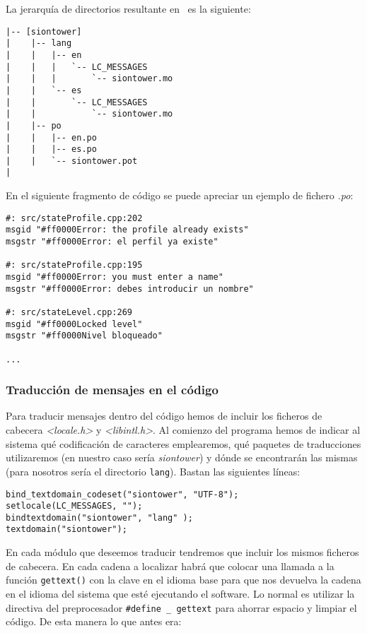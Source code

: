 La jerarquía de directorios resultante en \juego\ es la siguiente:\\

\begin{verbatim}
|-- [siontower]
|    |-- lang
|    |   |-- en
|    |   |   `-- LC_MESSAGES
|    |   |       `-- siontower.mo
|    |   `-- es
|    |       `-- LC_MESSAGES
|    |           `-- siontower.mo
|    |-- po
|    |   |-- en.po
|    |   |-- es.po
|    |   `-- siontower.pot
|
\end{verbatim}

En el siguiente fragmento de código se puede apreciar un ejemplo
de fichero \textit{.po}:\\

\begin{verbatim}
#: src/stateProfile.cpp:202
msgid "#ff0000Error: the profile already exists"
msgstr "#ff0000Error: el perfil ya existe"

#: src/stateProfile.cpp:195
msgid "#ff0000Error: you must enter a name"
msgstr "#ff0000Error: debes introducir un nombre"

#: src/stateLevel.cpp:269
msgid "#ff0000Locked level"
msgstr "#ff0000Nivel bloqueado"

...
\end{verbatim}

\subsubsection{Traducción de mensajes en el código}

Para traducir mensajes dentro del código hemos de incluir los ficheros de
cabecera \textit{<locale.h>} y \textit{<libintl.h>}. Al comienzo del programa
hemos de indicar al sistema qué codificación de caracteres emplearemos,
qué paquetes de traducciones utilizaremos (en nuestro
caso sería \textit{siontower}) y dónde se encontrarán las mismas (para nosotros
sería el directorio \texttt{lang}). Bastan las siguientes líneas:\\

\begin{lstlisting}[style=C++]
bind_textdomain_codeset("siontower", "UTF-8");
setlocale(LC_MESSAGES, "");
bindtextdomain("siontower", "lang" );
textdomain("siontower");
\end{lstlisting}

En cada módulo que deseemos traducir tendremos que incluir los mismos ficheros
de cabecera. En cada cadena a localizar habrá que colocar una llamada a la
función \texttt{gettext()} con la clave en el idioma base para que nos
devuelva la cadena en el idioma del sistema que esté ejecutando el software. 
Lo normal es utilizar la directiva del preprocesador \texttt{\#define \_ gettext}
para ahorrar espacio y limpiar el código. De esta manera lo que antes era:\\

